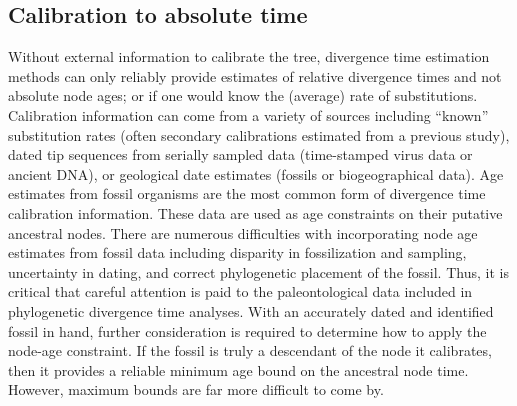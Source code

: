 \subsection{Calibration to absolute time}\label{sec:calibration}
Without external information to calibrate the tree, divergence time estimation methods can only reliably provide estimates of relative divergence times and not absolute node ages; or if one would know the (average) rate of substitutions. 
Calibration information can come from a variety of sources including ``known'' substitution rates (often secondary calibrations estimated from a previous study), dated tip sequences from serially sampled data (time-stamped virus data or ancient DNA), or geological date estimates (fossils or biogeographical data).
Age estimates from fossil organisms are the most common form of divergence time calibration information.
These data are used as age constraints on their putative ancestral nodes. 
There are numerous difficulties with incorporating node age estimates from fossil data including disparity in fossilization and sampling, uncertainty in dating, and correct phylogenetic placement of the fossil. 
Thus, it is critical that careful attention is paid to the paleontological data included in phylogenetic divergence time analyses. 
With an accurately dated and identified fossil in hand, further consideration is required to determine how to apply the node-age constraint. 
If the fossil is truly a descendant of the node it calibrates, then it provides a reliable minimum age bound on the ancestral node time. 
However, maximum bounds are far more difficult to come by. 

